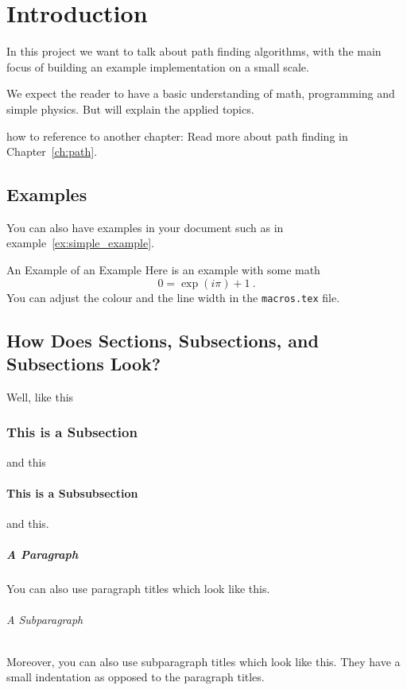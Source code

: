 \chapter{Introduction}\label{ch:introduction}
In this project we want to talk about path finding algorithms,
with the main focus of building an example implementation on a small scale.

We expect the reader to have a basic understanding of math, programming and simple physics.
But will explain the applied topics.

how to reference to another chapter:
Read more about path finding in Chapter~\ref{ch:path}.


\section{Examples}
You can also have examples in your document such as in example~\ref{ex:simple_example}.
\begin{example}{An Example of an Example}
  \label{ex:simple_example}
  Here is an example with some math
  \begin{equation}
    0 = \exp(i\pi)+1\ .
  \end{equation}
  You can adjust the colour and the line width in the {\tt macros.tex} file.
\end{example}

\section{How Does Sections, Subsections, and Subsections Look?}
Well, like this
\subsection{This is a Subsection}
and this
\subsubsection{This is a Subsubsection}
and this.

\paragraph{A Paragraph}
You can also use paragraph titles which look like this.

\subparagraph{A Subparagraph} Moreover, you can also use subparagraph titles which look like this.
They have a small indentation as opposed to the paragraph titles.

